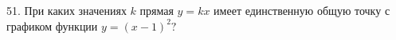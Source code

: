 51. При каких значениях $k$ прямая $y=kx$ имеет единственную общую точку
с графиком функции $y=(x-1)^2?$\\
